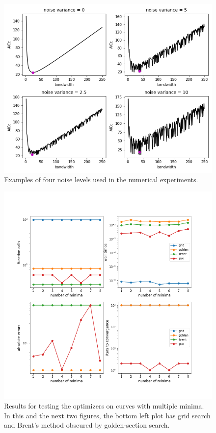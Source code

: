 \documentclass[letterpaper,12pt,twocolumn]{article}
\begin{document}
\begin{figure}
    \centering
    \includegraphics[width=\textwidth]{../figures/noisy-curves.png}
    \caption{Examples of four noise levels used in the numerical experiments.}
    \label{fig:noisy-curves}
\end{figure}

\begin{figure}
    \centering
    \includegraphics[width=\textwidth]{../figures/multmins-res.png}
    \caption{Results for testing the optimizers on curves with multiple minima. In this and the next two figures, the bottom left plot has grid search and Brent's method obscured by golden-section search.}
    \label{fig:multmins-res}
\end{figure}
\end{document}
